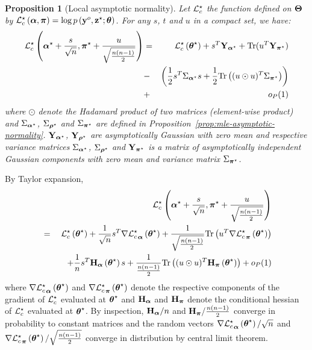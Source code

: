 \documentclass[]{imsart}
\newcommand{\1}{\mathds{1}}
\numberwithin{equation}{section}
\theoremstyle{plain}
\newtheorem{proposition}[thm]{Proposition}
\theoremstyle{remark}
\begin{document}
\begin{proposition}[Local asymptotic normality]\label{prop:LocalAsymp}
Let $\mathcal{L}_c^{\star}$ the function defined on $\boldsymbol{\Theta}$ by $\mathcal{L}_c^{\star}\left(\boldsymbol{\alpha},\boldsymbol{\pi}\right)=\log p\left(\mathbf{y}^o,\mathbf{z}^\star;\boldsymbol{\theta}\right)$. For any $s$, $t$ and $u$ in a compact set, we have:
\begin{eqnarray*}
\Lcs\left(\bpis+\frac{s}{\sqrt{\n}},\bals+\frac{u}{\sqrt{\frac{\n(\n-1)}{2}}}\right)
&=&\Lcs\left(\bthetas\right) + s\transpose\bY_{\bpis}+ \text{Tr}(u\transpose\bY_{\bals})\\
& -&\left(\frac{1}{2}s\transpose\Sig_{\bpis}s+\frac{1}{2} \text{Tr}\left((u \odot u)\transpose\Sig_{\bals}\right)\right)\\
&+&o_{P}(1)\\
\end{eqnarray*}
where $\odot$ denote the Hadamard product of two matrices (element-wise product) and $\Sigma_{\boldsymbol{\alpha}^\star}$, $\Sigma_{\boldsymbol{\rho}^\star}$ and $\Sigma_{\boldsymbol{\pi}^\star}$ are defined in Proposition~\ref{prop:mle-asymptotic-normality}. $\mathbf{Y}_{\boldsymbol{\alpha}^\star}$, $\mathbf{Y}_{\boldsymbol{\rho}^\star}$ are asymptotically Gaussian with zero mean and respective variance matrices $\Sigma_{\boldsymbol{\alpha}^\star}$, $\Sigma_{\boldsymbol{\rho}^\star}$ and $\mathbf{Y}_{\boldsymbol{\pi}^\star}$ is a matrix of asymptotically independent Gaussian components with zero mean and variance matrix $\Sigma_{\boldsymbol{\pi}^\star}$.
\end{proposition}
\proofbegin
By Taylor expansion,
\begin{eqnarray*}
& &\!\!\!\!\!\!\!\!\!\!\Lcs\left(\bpis+\frac{s}{\sqrt{\n}},\bals+\frac{u}{\sqrt{\frac{\n(\n-1)}{2}}}\right)\\
&=&\Lcs\left(\bthetas\right)+\frac{1}{\sqrt{\n}}s\transpose\nabla{\Lcs}_{\bpi}\left(\bthetas\right) +\frac{1}{\sqrt{\frac{\n(\n-1)}{2}}}\text{Tr}\left(u\transpose\nabla{\Lcs}_{\bal}\left(\bthetas\right)\right)\\
&&\quad+\frac{1}{\n}s\transpose\bH_{\bpi}\left(\bthetas\right)s+\frac{1}{\frac{\n(\n-1)}{2}}\text{Tr}\left((u \odot u)\transpose\bH_{\bal}\left(\bthetas\right)\right)+o_{P}(1)\\
\end{eqnarray*}
where $\nabla{\mathcal{L}_c^{\star}}_{\boldsymbol{\alpha}}\left(\boldsymbol{\theta}^\star\right)$ and $\nabla{\mathcal{L}_c^{\star}}_{\boldsymbol{\pi}}\left(\boldsymbol{\theta}^\star\right)$ denote the respective components of the gradient of $\mathcal{L}_c^{\star}$ evaluated at $\boldsymbol{\theta}^\star$ and $\mathbf{H}_{\boldsymbol{\alpha}}$ and $\mathbf{H}_{\boldsymbol{\pi}}$ denote the conditional hessian of $\mathcal{L}_c^{\star}$ evaluated at $\boldsymbol{\theta}^\star$. By inspection, $\mathbf{H}_{\boldsymbol{\alpha}}/n$ and $\mathbf{H}_{\boldsymbol{\pi}}/\frac{n(n-1)}{2}$ converge in probability to constant matrices and the random vectors $\nabla{\mathcal{L}_c^{\star}}_{\boldsymbol{\alpha}}\left(\boldsymbol{\theta}^\star\right)/\sqrt{n}$ and $\nabla{\mathcal{L}_c^{\star}}_{\boldsymbol{\pi}}\left(\boldsymbol{\theta}^\star\right)/\sqrt{\frac{n(n-1)}{2}}$ converge in distribution by central limit theorem. %
\proofend
\end{document}

